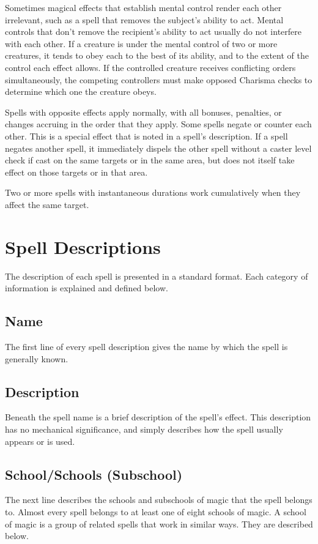  Sometimes magical effects that establish mental control render each other irrelevant, such as a spell that removes the subject's ability to act. Mental controls that don't remove the recipient's ability to act usually do not interfere with each other. If a creature is under the mental control of two or more creatures, it tends to obey each to the best of its ability, and to the extent of the control each effect allows. If the controlled creature receives conflicting orders simultaneously, the competing controllers must make opposed Charisma checks to determine which one the creature obeys.

 Spells with opposite effects apply normally, with all bonuses, penalties, or changes accruing in the order that they apply. Some spells negate or counter each other. This is a special effect that is noted in a spell's description. If a spell negates another spell, it immediately dispels the other spell without a caster level check if cast on the same targets or in the same area, but does not itself take effect on those targets or in that area.

 Two or more spells with instantaneous durations work cumulatively when they affect the same target.

\section{Spell Descriptions}
The description of each spell is presented in a standard format. Each category of information is explained and defined below.

\subsection{Name}
The first line of every spell description gives the name by which the spell is generally known.

\subsection{Description}
Beneath the spell name is a brief description of the spell's effect. This description has no mechanical significance, and simply describes how the spell usually appears or is used.

\subsection{School/Schools (Subschool)}
The next line describes the schools and subschools of magic that the spell belongs to. Almost every spell belongs to at least one of eight schools of magic. A school of magic is a group of related spells that work in similar ways. They are described below.

